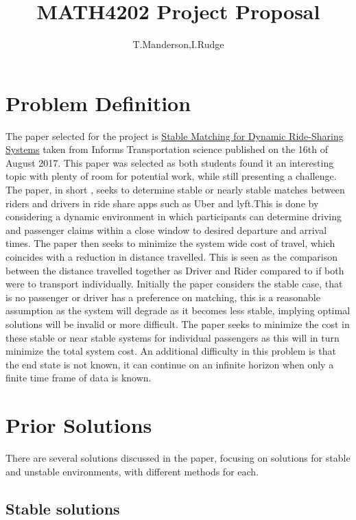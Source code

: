 \documentclass[]{report}
\title{MATH4202 Project Proposal}
\author{T.Manderson,I.Rudge}
\begin{document}
\maketitle
\section*{Problem Definition}
The paper selected for the project is \hyperref{http://pubsonline.informs.org/doi/pdf/10.1287/trsc.2017.0768}{Link}{Paper}{Stable Matching for Dynamic Ride-Sharing Systems} taken from Informs Transportation science published on the 16th of August 2017. This paper was selected as both students found it an interesting topic with plenty of room for potential work, while still presenting a challenge.  
\newline
The paper, in short , seeks to determine stable or nearly stable matches between riders and drivers in ride share apps such as Uber and lyft.This is done by considering a dynamic environment in which participants can determine driving and passenger claims within a close window to desired departure and arrival times. The paper then seeks to minimize the system wide cost of travel, which coincides with a reduction in distance travelled. This is seen as the comparison between the distance travelled together as Driver and Rider compared to if both were to transport individually. Initially the paper considers the stable case, that is no passenger or driver has a preference on matching, this is a reasonable assumption as the system will degrade as it becomes less stable, implying optimal solutions will be invalid or more difficult. The paper seeks to minimize the cost in these stable or near stable systems for individual passengers as this will in turn minimize the total system cost.
An additional difficulty in this problem is that the end state is not known, it can continue on an infinite horizon when only a finite time frame of data is known.  


\section*{Prior Solutions}
There are several solutions discussed in the paper, focusing on solutions for stable and unstable environments, with different methods for each. 
\subsection*{Stable solutions}
\end{document}
